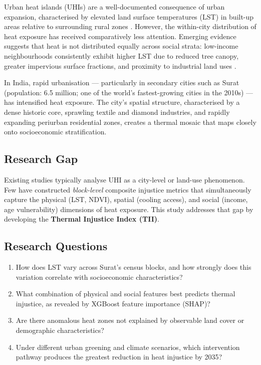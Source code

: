 \documentclass[12pt, a4paper]{article}
\begin{document}
Urban heat islands (UHIs) are a well-documented consequence of urban expansion,
characterised by elevated land surface temperatures (LST) in built-up areas
relative to surrounding rural zones \citep{oke1982energetic}. However, the
within-city distribution of heat exposure has received comparatively less attention.
Emerging evidence suggests that heat is not distributed equally across social
strata: low-income neighbourhoods consistently exhibit higher LST due to reduced
tree canopy, greater impervious surface fractions, and proximity to industrial
land uses \citep{heaviside2017urban}.

In India, rapid urbanisation — particularly in secondary cities such as Surat
(population: 6.5 million; one of the world's fastest-growing cities in the 2010s)
— has intensified heat exposure. The city's spatial structure, characterised by
a dense historic core, sprawling textile and diamond industries, and rapidly
expanding periurban residential zones, creates a thermal mosaic that maps closely
onto socioeconomic stratification.

\subsection{Research Gap}

Existing studies typically analyse UHI as a city-level or land-use phenomenon.
Few have constructed \textit{block-level} composite injustice metrics that
simultaneously capture the physical (LST, NDVI), spatial (cooling access), and
social (income, age vulnerability) dimensions of heat exposure. This study
addresses that gap by developing the \textbf{Thermal Injustice Index (TII)}.

\subsection{Research Questions}

\begin{enumerate}
  \item How does LST vary across Surat's census blocks, and how strongly does
        this variation correlate with socioeconomic characteristics?
  \item What combination of physical and social features best predicts thermal
        injustice, as revealed by XGBoost feature importance (SHAP)?
  \item Are there anomalous heat zones not explained by observable land cover
        or demographic characteristics?
  \item Under different urban greening and climate scenarios, which intervention
        pathway produces the greatest reduction in heat injustice by 2035?
\end{enumerate}
\end{document}
